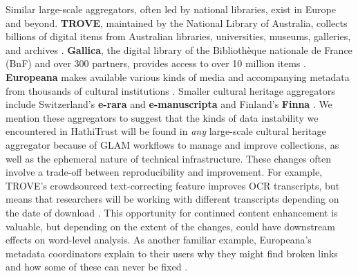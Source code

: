 \documentclass[final]{anthology-ch} %
\begin{document}
Similar large-scale aggregators, often led by national libraries, exist in Europe and beyond. \textbf{TROVE}, maintained by the National Library of Australia, collects billions of digital items from Australian libraries, universities, museums, galleries, and archives \cite{noauthor_home_nodate}. \textbf{Gallica}, the digital library of the Bibliothèque nationale de France (BnF) and over 300 partners, provides access to over 10 million items \cite{noauthor_page_nodate}. \textbf{Europeana} makes available various kinds of media and accompanying metadata from thousands of cultural institutions \cite{noauthor_discover_nodate}. Smaller cultural heritage aggregators include Switzerland’s \textbf{e-rara} \cite{noauthor_e-rara_nodate} and \textbf{e-manuscripta} \cite{noauthor_e-manuscripta_nodate} and Finland’s \textbf{Finna} \cite{noauthor_search_nodate}. We mention these aggregators to suggest that the kinds of data instability we encountered in HathiTrust will be found in \textit{any }large-scale cultural heritage aggregator because of GLAM workflows to manage and improve collections, as well as the ephemeral nature of technical infrastructure. These changes often involve a trade-off between reproducibility and improvement. For example, TROVE’s crowdsourced text-correcting feature improves OCR transcripts, but means that researchers will be working with different transcripts depending on the date of download \cite{noauthor_text_nodate}. This opportunity for continued content enhancement is valuable, but depending on the extent of the changes, could have downstream effects on word-level analysis. As another familiar example, Europeana's metadata coordinators explain to their users why they might find broken links and how some of these can never be fixed \cite{noauthor_keeping_nodate}.
\end{document}
